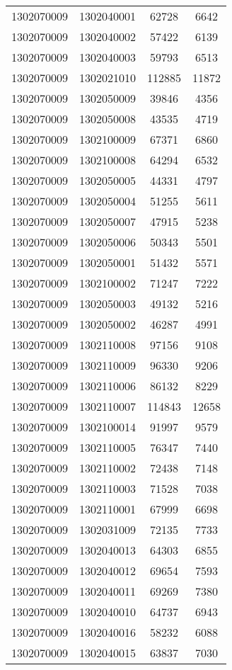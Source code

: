 \begin{longtable}[h]{llcc}
		1302070009 & 1302040001 & 62728 & 6642\\
		1302070009 & 1302040002 & 57422 & 6139\\
		1302070009 & 1302040003 & 59793 & 6513\\
		1302070009 & 1302021010 & 112885 & 11872\\
		1302070009 & 1302050009 & 39846 & 4356\\
		1302070009 & 1302050008 & 43535 & 4719\\
		1302070009 & 1302100009 & 67371 & 6860\\
		1302070009 & 1302100008 & 64294 & 6532\\
		1302070009 & 1302050005 & 44331 & 4797\\
		1302070009 & 1302050004 & 51255 & 5611\\
		1302070009 & 1302050007 & 47915 & 5238\\
		1302070009 & 1302050006 & 50343 & 5501\\
		1302070009 & 1302050001 & 51432 & 5571\\
		1302070009 & 1302100002 & 71247 & 7222\\
		1302070009 & 1302050003 & 49132 & 5216\\
		1302070009 & 1302050002 & 46287 & 4991\\
		1302070009 & 1302110008 & 97156 & 9108\\
		1302070009 & 1302110009 & 96330 & 9206\\
		1302070009 & 1302110006 & 86132 & 8229\\
		1302070009 & 1302110007 & 114843 & 12658\\
		1302070009 & 1302100014 & 91997 & 9579\\
		1302070009 & 1302110005 & 76347 & 7440\\
		1302070009 & 1302110002 & 72438 & 7148\\
		1302070009 & 1302110003 & 71528 & 7038\\
		1302070009 & 1302110001 & 67999 & 6698\\
		1302070009 & 1302031009 & 72135 & 7733\\
		1302070009 & 1302040013 & 64303 & 6855\\
		1302070009 & 1302040012 & 69654 & 7593\\
		1302070009 & 1302040011 & 69269 & 7380\\
		1302070009 & 1302040010 & 64737 & 6943\\
		1302070009 & 1302040016 & 58232 & 6088\\
		1302070009 & 1302040015 & 63837 & 7030\\

\end{longtable}
